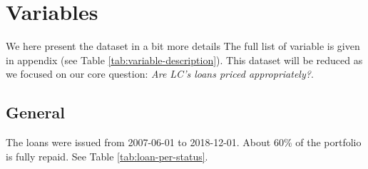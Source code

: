 \documentclass[11pt,]{report}
\newenvironment{Shaded}{\begin{snugshade}}{\end{snugshade}}
\newcommand{\DataTypeTok}[1]{\textcolor[rgb]{0.13,0.29,0.53}{#1}}
\newcommand{\DecValTok}[1]{\textcolor[rgb]{0.00,0.00,0.81}{#1}}
\newcommand{\KeywordTok}[1]{\textcolor[rgb]{0.13,0.29,0.53}{\textbf{#1}}}
\newcommand{\NormalTok}[1]{#1}
\newcommand{\OperatorTok}[1]{\textcolor[rgb]{0.81,0.36,0.00}{\textbf{#1}}}
\newcommand{\StringTok}[1]{\textcolor[rgb]{0.31,0.60,0.02}{#1}}
\begin{document}
\begin{Shaded}
\end{Shaded}

\hypertarget{variables}{%
\section{Variables}\label{variables}}

We here present the dataset in a bit more details The full list of variable is given in appendix (see Table \ref{tab:variable-description}). This dataset will be reduced as we focused on our core question: \emph{Are LC's loans priced appropriately?}.

\hypertarget{general}{%
\subsection{General}\label{general}}

The loans were issued from 2007-06-01 to 2018-12-01. About 60\% of the portfolio is fully repaid. See Table \ref{tab:loan-per-status}.
\end{document}
